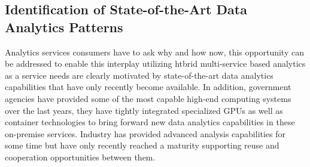 \subsection{Identification of State-of-the-Art Data Analytics Patterns}

Analytics services consumers have to ask why and how now,
this opportunity can be addressed to enable this interplay utilizing
htbrid multi-service based analytics as a service needs are clearly
motivated by state-of-the-art data analytics capabilities that have
only recently become available.  In addition, government agencies have
provided some of the most capable high-end computing systems over the
last years, they have tightly integrated specialized GPUs as well as
container technologies to bring forward new data analytics
capabilities in these on-premise services. Industry has provided
advanced analysis capabilities for some time but have only recently
reached a maturity supporting reuse and cooperation opportunities
between them.

